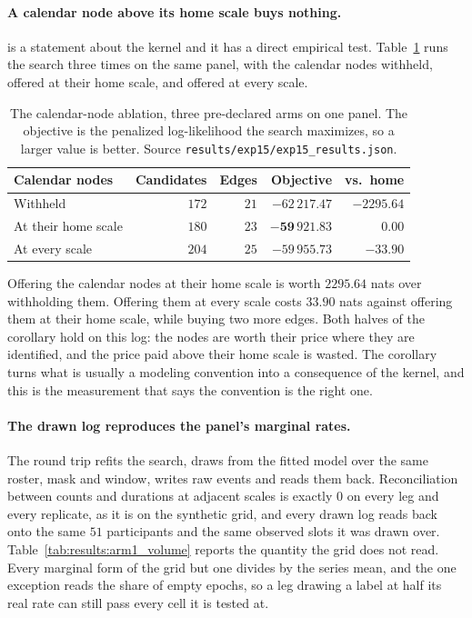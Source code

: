 \paragraph{A calendar node above its home scale buys nothing.}
 is a statement about the kernel and it has a
direct empirical test. Table~\ref{tab:results:arm1_calendar} runs the search
three times on the same panel, with the calendar nodes withheld, offered at
their home scale, and offered at every scale.

\begin{table}[t]
\centering
\caption{The calendar-node ablation, three pre-declared arms on one panel.
The objective is the penalized log-likelihood the search maximizes, so a
larger value is better. Source \texttt{results/exp15/exp15\_results.json}.}
\label{tab:results:arm1_calendar}
\small
\begin{tabular}{lrrrr}
\toprule
Calendar nodes & Candidates & Edges & Objective & vs.\ home \\
\midrule
Withheld          & $172$ & $21$ & $-62\,217.47$ & $-2295.64$ \\
At their home scale & $180$ & $23$ & $\mathbf{-59\,921.83}$ & $0.00$ \\
At every scale    & $204$ & $25$ & $-59\,955.73$ & $-33.90$ \\
\bottomrule
\end{tabular}
\end{table}

Offering the calendar nodes at their home scale is worth $2295.64$ nats over
withholding them. Offering them at every scale costs $33.90$ nats against
offering them at their home scale, while buying two more edges. Both halves of
the corollary hold on this log: the nodes are worth their price where they are
identified, and the price paid above their home scale is wasted. The corollary
turns what is usually a modeling convention into a consequence of the kernel,
and this is the measurement that says the convention is the right one.

\paragraph{The drawn log reproduces the panel's marginal rates.}
The round trip refits the search, draws from the fitted model over the same
roster, mask and window, writes raw events and reads them back. Reconciliation
between counts and durations at adjacent scales is exactly $0$ on every leg and
every replicate, as it is on the synthetic grid, and every drawn log reads back
onto the same $51$ participants and the same observed slots it was drawn over.
Table~\ref{tab:results:arm1_volume} reports the quantity the grid does not
read. Every marginal form of the grid but one divides by the series mean, and
the one exception reads the share of empty epochs, so a leg drawing a label at
half its real rate can still pass every cell it is tested at.

